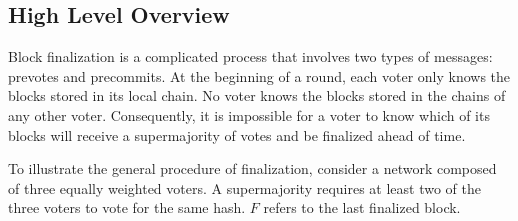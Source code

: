 \subsection{High Level Overview}

Block finalization is a complicated process that involves two types of messages: prevotes and precommits.
At the beginning of a round, each voter only knows the blocks stored in its local chain.
No voter knows the blocks stored in the chains of any other voter.
Consequently, it is impossible for a voter to know which of its blocks will receive a supermajority of votes and be finalized ahead of time.

To illustrate the general procedure of finalization, consider a network composed of three equally weighted voters.
A supermajority requires at least two of the three voters to vote for the same hash.
$F$ refers to the last finalized block.

